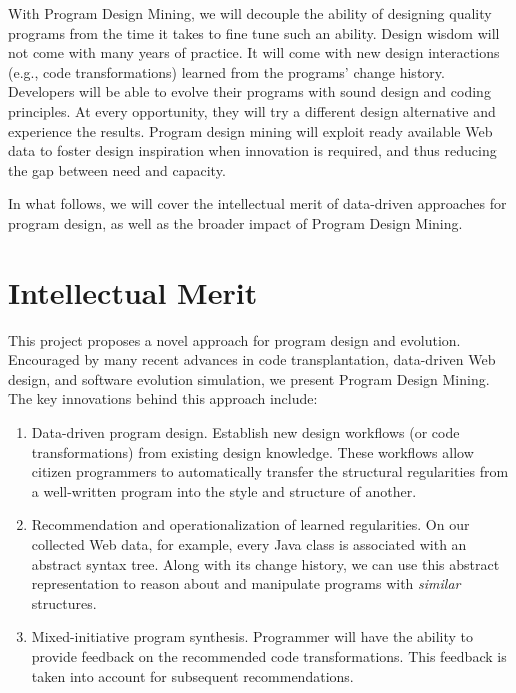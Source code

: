 With Program Design Mining, we will decouple the ability of designing quality 
programs from the time it takes to fine tune such an ability. Design wisdom 
will not come with many years of practice. It will come with new design 
interactions (e.g., code transformations) learned from the programs' 
change history. Developers will be able to evolve their programs with 
sound design and coding principles. At every opportunity, they will try a 
different design alternative and experience the results. Program design 
mining will exploit ready available Web data to foster design inspiration 
when innovation is required, and thus reducing the gap between need and 
capacity.

In what follows, we will cover the intellectual merit of data-driven 
approaches for program design, as well as the broader impact of Program 
Design Mining.

\section*{Intellectual Merit} %
\label{sec:merit}

This project proposes a novel approach for program design and 
evolution. Encouraged by many recent advances in code transplantation, 
data-driven Web design, and software evolution simulation, we 
present Program Design Mining. The key innovations behind this 
approach include:

\begin{enumerate}
	\item Data-driven program design. Establish new design workflows (or code 
	transformations) from existing design knowledge. These workflows allow 
	citizen programmers to automatically transfer the structural regularities 
	from a well-written program into the style and structure of another.  
	\item Recommendation and operationalization of learned regularities. 
	On our collected Web data, for example, every Java class is associated 
	with an abstract syntax tree. Along with its change history, we can use 
	this abstract representation to reason about and manipulate programs 
	with \textit{similar} structures.
	\item Mixed-initiative program synthesis. Programmer will have the ability 
	to provide feedback on the recommended code transformations. This feedback 
	is taken into account for subsequent recommendations.
\end{enumerate}

